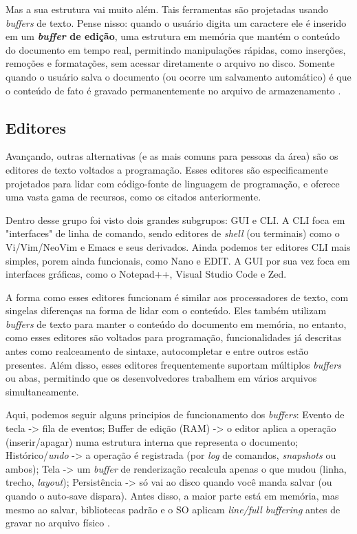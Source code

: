 Mas a sua estrutura vai muito além. Tais ferramentas são projetadas usando \textit{buffers}
de texto. Pense nisso: quando o usuário digita um caractere ele é inserido em um
\textbf{\textit{buffer} de edição}, uma estrutura em memória que mantém o
conteúdo do documento em tempo real, permitindo manipulações rápidas, como
inserções, remoções e formatações, sem acessar diretamente o arquivo no disco. Somente
quando o usuário salva o documento (ou ocorre um salvamento automático) é que o conteúdo
de fato é gravado permanentemente no arquivo de armazenamento \cite{Jacobson1989}.

\subsection{Editores}

Avançando, outras alternativas (e as mais comuns para pessoas da área) são os editores
de texto voltados a programação. Esses editores são especificamente projetados
para lidar com código-fonte de linguagem de programação, e oferece uma vasta gama
de recursos, como os citados anteriormente.

Dentro desse grupo foi visto dois grandes subgrupos: GUI e CLI. A CLI foca em "interfaces"
de linha de comando, sendo editores de \textit{shell} (ou terminais) como o Vi/Vim/NeoVim
e Emacs e seus derivados. Ainda podemos ter editores CLI mais simples, porem
ainda funcionais, como Nano e EDIT. A GUI por sua vez foca em interfaces
gráficas, como o Notepad++, Visual Studio Code e Zed.

A forma como esses editores funcionam é similar aos processadores de texto, com singelas
diferenças na forma de lidar com o conteúdo. Eles também utilizam \textit{buffers}
de texto para manter o conteúdo do documento em memória, no entanto, como esses editores
são voltados para programação, funcionalidades já descritas antes como
realceamento de sintaxe, autocompletar e entre outros estão presentes. Além
disso, esses editores frequentemente suportam múltiplos \textit{buffers} ou abas,
permitindo que os desenvolvedores trabalhem em vários arquivos simultaneamente.

Aqui, podemos seguir alguns principios de funcionamento dos \textit{buffers}:
Evento de tecla -> fila de eventos; Buffer de edição (RAM) -> o editor aplica a operação
(inserir/apagar) numa estrutura interna que representa o documento; Histórico/\textit{undo}
-> a operação é registrada (por \textit{log} de comandos, \textit{snapshots} ou
ambos); Tela -> um \textit{buffer} de renderização recalcula apenas o que mudou
(linha, trecho, \textit{layout}); Persistência -> só vai ao disco quando você manda
salvar (ou quando o auto-save dispara). Antes disso, a maior parte está em memória,
mas mesmo ao salvar, bibliotecas padrão e o SO aplicam \textit{line/full
buffering} antes de gravar no arquivo físico \cite{glibc-buffering-concepts}.

